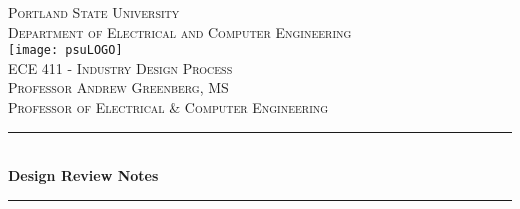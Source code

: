 \documentclass[11pt]{article}
\begin{document}

\begin{titlepage} %
	\newcommand{\HRule}{\rule{\linewidth}{0.5mm}} %
	
	\center %
	
	
	\textsc{\LARGE Portland State University
}\\[.25cm] %
	
	\textsc{\Large Department of Electrical and Computer Engineering }\\[.5cm] %
\texttt{[image: psuLOGO]}\\[.5cm]	
	\textsc{\LARGE ECE 411 - Industry Design Process }\\[0.75cm] %
	
		\textsc{\Large Professor Andrew Greenberg, MS\\
Professor of Electrical \& Computer Engineering
 }\\[.75cm]
	
	
	\HRule\\[0.4cm]
	
	{\huge\bfseries Design Review Notes}\\[0.4cm] %
	
	\HRule\\[1.5cm]
	
	
	

\end{titlepage}
\end{document}

